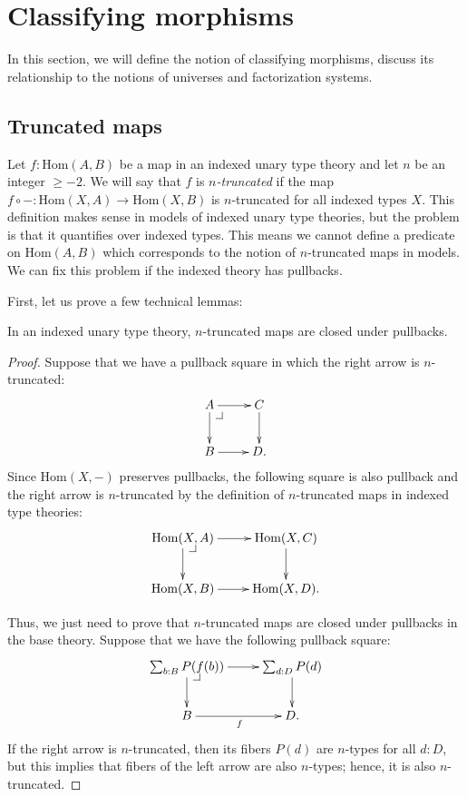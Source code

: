 \documentclass[reqno]{mscs}
\makeatletter
\newcommand{\fs}[1]{\mathrm{#1}}
\newcommand{\Hom}{\fs{Hom}}
\numberwithin{figure}{section}
\newcommand{\pb}[1][dr]{\save*!/#1-1.2pc/#1:(-1,1)@^{|-}\restore}
\makeatother
\begin{document}
\section{Classifying morphisms}
\label{sec:class}

In this section, we will define the notion of classifying morphisms, discuss its relationship to the notions of universes and factorization systems.

\subsection{Truncated maps}

Let $f : \Hom(A,B)$ be a map in an indexed unary type theory and let $n$ be an integer $\geq -2$.
We will say that $f$ is \emph{$n$-truncated} if the map $f \circ - : \Hom(X,A) \to \Hom(X,B)$ is $n$-truncated for all indexed types $X$.
This definition makes sense in models of indexed unary type theories, but the problem is that it quantifies over indexed types.
This means we cannot define a predicate on $\Hom(A,B)$ which corresponds to the notion of $n$-truncated maps in models.
We can fix this problem if the indexed theory has pullbacks.

First, let us prove a few technical lemmas:

\begin{lem}[trunc-pb]
In an indexed unary type theory, $n$-truncated maps are closed under pullbacks.
\end{lem}
\begin{proof}
Suppose that we have a pullback square in which the right arrow is $n$-truncated:
\[ \xymatrix{ A \ar[r] \ar[d] \pb   & C \ar[d] \\
              B \ar[r]              & D.
            } \]
Since $\Hom(X,-)$ preserves pullbacks, the following square is also pullback and the right arrow is $n$-truncated by the definition of $n$-truncated maps in indexed type theories:
\[ \xymatrix{ \Hom(X,A) \ar[r] \ar[d] \pb   & \Hom(X,C) \ar[d] \\
              \Hom(X,B) \ar[r]              & \Hom(X,D).
            } \]

Thus, we just need to prove that $n$-truncated maps are closed under pullbacks in the base theory.
Suppose that we have the following pullback square:
\[ \xymatrix{ \sum_{b : B} P(f(b)) \ar[r] \ar[d] \pb    & \sum_{d : D} P(d) \ar[d] \\
              B \ar[r]_f                                & D.
            } \]
If the right arrow is $n$-truncated, then its fibers $P(d)$ are $n$-types for all $d : D$, but this implies that fibers of the left arrow are also $n$-types; hence, it is also $n$-truncated.
\end{proof}
\end{document}
